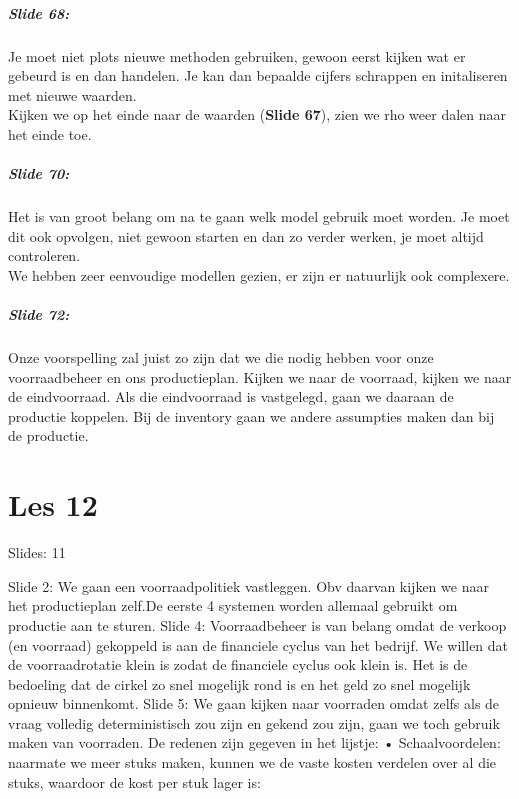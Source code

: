 \documentclass[10pt,a4paper]{report}
\begin{document}
\paragraph{Slide 68:} Je moet niet plots nieuwe methoden gebruiken, gewoon eerst kijken wat er gebeurd is en dan handelen. Je kan dan bepaalde cijfers schrappen en initaliseren met nieuwe waarden.\\
Kijken we op het einde naar de waarden (\textbf{Slide 67}), zien we rho weer dalen naar het einde toe.

\paragraph{Slide 70:} Het is van groot belang om na te gaan welk model gebruik moet worden. Je moet dit ook opvolgen, niet gewoon starten en dan zo verder werken, je moet altijd controleren.\\
We hebben zeer eenvoudige modellen gezien, er zijn er natuurlijk ook complexere. 

\paragraph{Slide 72:} Onze voorspelling zal juist zo zijn dat we die nodig hebben voor onze voorraadbeheer en ons productieplan. Kijken we naar de voorraad, kijken we naar de eindvoorraad. Als die eindvoorraad is vastgelegd, gaan we daaraan de productie koppelen. Bij de inventory gaan we andere assumpties maken dan bij de productie.

\chapter{Les 12}
Slides: 11

Slide 2: We gaan een voorraadpolitiek vastleggen. Obv daarvan kijken we naar het productieplan zelf.De eerste 4 systemen worden allemaal gebruikt om productie aan te sturen. 
Slide 4: Voorraadbeheer is van belang omdat de verkoop (en voorraad) gekoppeld is aan de financiele cyclus van het bedrijf. We willen dat de voorraadrotatie klein is zodat de financiele cyclus ook klein is. Het is de bedoeling dat de cirkel zo snel mogelijk rond is en het geld zo snel mogelijk opnieuw binnenkomt.
Slide 5: We gaan kijken naar voorraden omdat zelfs als de vraag volledig deterministisch zou zijn en gekend zou zijn, gaan we toch gebruik maken van voorraden. De redenen zijn gegeven in het lijstje:
	• Schaalvoordelen: naarmate we meer stuks maken, kunnen we de vaste kosten verdelen over al die stuks, waardoor de kost per stuk lager is:
\end{document}
